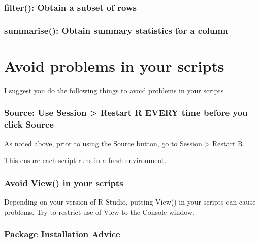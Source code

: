 \documentclass[
]{krantz}
\begin{document}
\hypertarget{filter-obtain-a-subset-of-rows}{%
\subsubsection{filter(): Obtain a subset of rows}\label{filter-obtain-a-subset-of-rows}}

\hypertarget{summarise-obtain-summary-statistics-for-a-column}{%
\subsubsection{summarise(): Obtain summary statistics for a column}\label{summarise-obtain-summary-statistics-for-a-column}}

\hypertarget{avoid-problems-in-your-scripts}{%
\section{Avoid problems in your scripts}\label{avoid-problems-in-your-scripts}}

I suggest you do the following things to avoid problems in your scripts

\hypertarget{source-use-session-restart-r-every-time-before-you-click-source-1}{%
\subsubsection{Source: Use Session \textgreater{} Restart R EVERY time before you click Source}\label{source-use-session-restart-r-every-time-before-you-click-source-1}}

As noted above, prior to using the Source button, go to Session \textgreater{} Restart R.

This ensure each script runs in a fresh environment.

\hypertarget{avoid-view-in-your-scripts}{%
\subsubsection{Avoid View() in your scripts}\label{avoid-view-in-your-scripts}}

Depending on your version of R Studio, putting View() in your scripts can cause problems. Try to restrict use of View to the Console window.

\hypertarget{package-installation-advice}{%
\subsubsection{Package Installation Advice}\label{package-installation-advice}}
\end{document}
